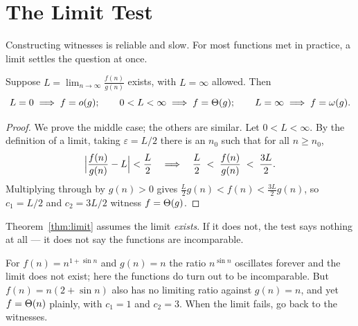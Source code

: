\section{The Limit Test}

Constructing witnesses is reliable and slow. For most functions met in
practice, a limit settles the question at once.

\begin{theorem}\label{thm:limit}
Suppose $L = \displaystyle\lim_{n \to \infty} \frac{f(n)}{g(n)}$ exists, with
$L = \infty$ allowed. Then
\[ L = 0 \implies f = o(g); \qquad
   0 < L < \infty \implies f = \Theta(g); \qquad
   L = \infty \implies f = \omega(g). \]
\end{theorem}

\begin{proof}
We prove the middle case; the others are similar. Let $0 < L < \infty$. By the
definition of a limit, taking $\varepsilon = L/2$ there is an $n_{0}$ such that
for all $n \ge n_{0}$,
\[ \Bigl| \frac{f(n)}{g(n)} - L \Bigr| < \frac{L}{2}
   \quad\Longrightarrow\quad
   \frac{L}{2} \;<\; \frac{f(n)}{g(n)} \;<\; \frac{3L}{2}. \]
Multiplying through by $g(n) > 0$ gives
$\tfrac{L}{2}g(n) < f(n) < \tfrac{3L}{2}g(n)$, so $c_{1} = L/2$ and
$c_{2} = 3L/2$ witness $f = \Theta(g)$.
\end{proof}

\begin{alertbox}
Theorem~\ref{thm:limit} assumes the limit \emph{exists}. If it does not, the
test says nothing at all --- it does not say the functions are incomparable.

\smallskip
For $f(n) = n^{1+\sin n}$ and $g(n) = n$ the ratio $n^{\sin n}$ oscillates
forever and the limit does not exist; here the functions do turn out to be
incomparable. But $f(n) = n(2 + \sin n)$ also has no limiting ratio against
$g(n) = n$, and yet $f = \Theta(n)$ plainly, with $c_{1} = 1$ and $c_{2} = 3$.
When the limit fails, go back to the witnesses.
\end{alertbox}

